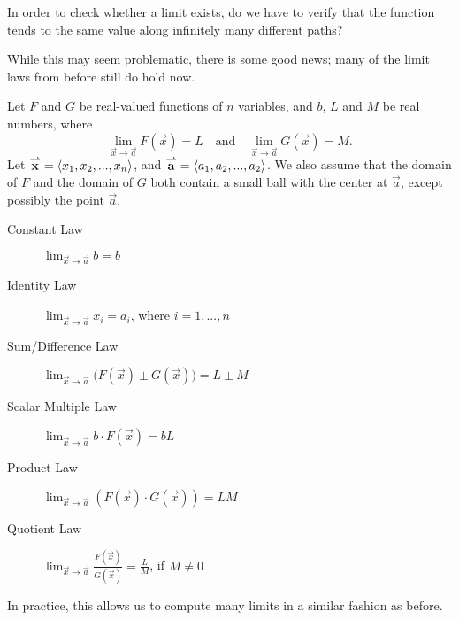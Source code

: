 \documentclass{ximera}
\begin{document}


In order to check whether a limit exists, do we have to verify that the function tends to the same value along infinitely many different paths?

  While this may seem problematic, there is some good news; many of the limit laws from before still do hold now.

\begin{theorem}
  Let $F$ and $G$ be real-valued functions of $n$
  variables, and $b$, $L$ and $M$ be real numbers, where
  \[
  \lim_{\vec{x}\to\vec{a}}F(\vec{x}) = L \quad \text{and}\quad \lim_{\vec{x}\to\vec{a}} G(\vec{x}) = M.
  \]
Let ${\overset{\boldsymbol{\rightharpoonup}}{\mathbf{x}}}\hspace{0in} = \left\langle x_{1},x_{2},...,x_{n}\right\rangle$, and ${\overset{\boldsymbol{\rightharpoonup}}{\mathbf{a}}}\hspace{0in} = \left\langle a_{1},a_{2},...,a_{2}\right\rangle$. We  also assume that  the domain of $F$ and the domain of $G$
 both  contain a small ball with the center at $\vec{a}$, except possibly the point $\vec{a}$.
\begin{description}
\item[Constant Law] $\lim_{\vec{x}\to \vec{a}} b = b$
\item[Identity Law] $\lim_{\vec{x}\to \vec{a}} x_i = a_i$, where $i=1,..., n$
\item[Sum/Difference Law] $\lim_{\vec{x}\to \vec{a}}\big(F(\vec{x})\pm G(\vec{x})\big) = L\pm M$
\item[Scalar Multiple Law] $\lim_{\vec{x}\to \vec{a}} b\cdot F(\vec{x}) = bL$
\item[Product Law] $\lim_{\vec{x}\to \vec{a}} \left(F(\vec{x})\cdot G(\vec{x})\right) = LM$
\item[Quotient Law] $\lim_{\vec{x}\to \vec{a}} \frac{F(\vec{x})}{G(\vec{x})} = \frac{L}{M}$, if $M\neq 0$
\end{description}
\end{theorem}

In practice, this allows us to compute many limits in a similar fashion as before.
\end{document}
